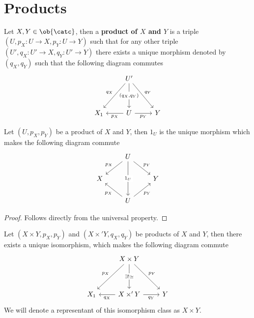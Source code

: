 \section{Products}

\begin{definition}
    Let $X,Y\in\ob{\catc}$, then a \textbf{product of $X$ and $Y$} is a triple $(U,p_X : U \to X, p_Y : U \to Y)$ such that
    for any other triple $(U', q_X : U' \to X, q_Y: U' \to Y)$ there exists a unique morphism denoted by $(q_X,q_Y)$
    such that the following diagram commutes
    \[\begin{tikzcd}
	& {U'} \\
	\\
	{X_1} & U & Y
	\arrow["{q_{X}}"', from=1-2, to=3-1]
	\arrow["{(q_X,q_Y)}"{description}, from=1-2, to=3-2]
	\arrow["{q_{Y}}", from=1-2, to=3-3]
	\arrow["{p_{X}}", from=3-2, to=3-1]
	\arrow["{p_{Y}}"', from=3-2, to=3-3]
    \end{tikzcd}\]
\end{definition}
\begin{lemma}
    \label{uniqueselfmapLemma}
    Let $(U,p_X,p_Y)$ be a product of $X$ and $Y$, then $1_U$ is the unique morphism which makes
    the following diagram commute 
    \[\begin{tikzcd}
	& U \\
	X && Y \\
	& U
	\arrow["{p_X}"', from=1-2, to=2-1]
	\arrow["{p_Y}", from=1-2, to=2-3]
	\arrow["{1_U}"{description}, from=1-2, to=3-2]
	\arrow["{p_X}", from=3-2, to=2-1]
	\arrow["{p_Y}"', from=3-2, to=2-3]
    \end{tikzcd}\]
\end{lemma}
\begin{proof}[Proof]
    Follows directly from the universal property.
\end{proof}
\begin{lemma}
    \label{uniqueproductLemma}
    Let $(X\times Y, p_X, p_Y)$ and $(X\times' Y, q_X, q_Y)$ be products of $X$ and $Y$, then there exists
    a unique isomorphism, which makes the following diagram commute
    \[\begin{tikzcd}
        & {X\times Y} \\
        \\
        {X_1} & {X\times' Y} & Y
        \arrow["{{p_{X}}}"', from=1-2, to=3-1]
        \arrow["{\exists !\newline \simeq}"{description}, from=1-2, to=3-2]
        \arrow["{{p_{Y}}}", from=1-2, to=3-3]
        \arrow["{{q_{X}}}", from=3-2, to=3-1]
        \arrow["{{q_{Y}}}"', from=3-2, to=3-3]
    \end{tikzcd}\]
    We will denote a representant of this isomorphism class as $X\times Y$.
\end{lemma}
